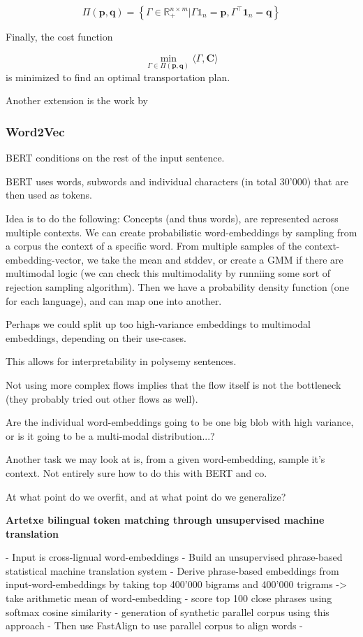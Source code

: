 \documentclass[a4paper,12pt,twoside,openright]{report}
\begin{document}
$$
\Pi(\mathbf{p}, \mathbf{q})=\left\{\Gamma \in \mathbb{R}_{+}^{n \times m} | \Gamma \mathbb{1}_{n}=\mathbf{p}, \Gamma^{\top} \mathbf{1}_{n}=\mathbf{q}\right\}
$$

Finally, the cost function

$$
\min _{\Gamma \in \Pi(\mathbf{p}, \mathbf{q})}\langle\Gamma, \mathbf{C}\rangle
$$
is minimized to find an optimal transportation plan.


Another extension is the work by  


\newpage
\subsubsection{Word2Vec}

BERT conditions on the rest of the input sentence.

BERT uses words, subwords and individual characters (in total 30'000) that are then used as tokens.

Idea is to do the following:
Concepts (and thus words), are represented across multiple contexts.
We can create probabilistic word-embeddings by sampling from a corpus the context of a specific word.
From multiple samples of the context-embedding-vector, we take the mean and stddev, or create a GMM if there are multimodal logic (we can check this multimodality by runniing some sort of rejection sampling algorithm).
Then we have a probability density function (one for each language), and can map one into another.

Perhaps we could split up too high-variance embeddings to multimodal embeddings, depending on their use-cases.

This allows for interpretability in polysemy sentences.

Not using more complex flows implies that the flow itself is not the bottleneck (they probably tried out other flows as well).

Are the individual word-embeddings going to be one big blob with high variance, or is it going to be a multi-modal distribution...?

Another task we may look at is, from a given word-embedding, sample it's context. 
Not entirely sure how to do this with BERT and co.

At what point do we overfit, and at what point do we generalize?


\textbf{Artetxe bilingual token matching through unsupervised machine translation}

- Input is cross-lignual word-embeddings
- Build an unsupervised phrase-based statistical machine translation system
- Derive phrase-based embeddings from input-word-embeddings by taking top 400'000 bigrams and 400'000 trigrams -> take arithmetic mean of word-embedding
- score top 100 close phrases using softmax cosine similarity
- generation of synthetic parallel corpus using this approach
- Then use FastAlign to use parallel corpus to align words
- 
\end{document}
